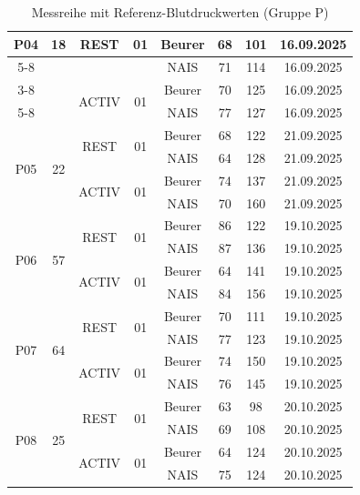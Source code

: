 \documentclass[a4paper, 11pt]{scrartcl}
\begin{document}
\begin{table}[H]
{\begin{tabular}{|c|c|c|c|c|c|c|c|}
\multirow{4}{*}{P04} & \multirow{4}{*}{18}
& \multirow{2}{*}{REST} 
& \multirow{2}{*}{01} & Beurer & 68 & 101 & 16.09.2025 \\ \cline{5-8}
& & & & NAIS & 71 & 114 & 16.09.2025 \\ \cline{3-8}
& & \multirow{2}{*}{ACTIV} 
& \multirow{2}{*}{01} & Beurer & 70 & 125 & 16.09.2025 \\ \cline{5-8}
& & & & NAIS & 77 & 127 & 16.09.2025 \\ \hline

\multirow{4}{*}{P05} & \multirow{4}{*}{22}
& \multirow{2}{*}{REST} 
& \multirow{2}{*}{01} & Beurer & 68 & 122 & 21.09.2025 \\ \cline{5-8}
& & & & NAIS & 64 & 128 & 21.09.2025 \\ \cline{3-8}
& & \multirow{2}{*}{ACTIV} 
& \multirow{2}{*}{01} & Beurer & 74 & 137 & 21.09.2025 \\ \cline{5-8}
& & & & NAIS & 70 & 160 & 21.09.2025 \\ \hline

\multirow{4}{*}{P06} & \multirow{4}{*}{57}
& \multirow{2}{*}{REST} 
& \multirow{2}{*}{01} & Beurer & 86 & 122 & 19.10.2025 \\ \cline{5-8}
& & & & NAIS & 87 & 136 & 19.10.2025 \\ \cline{3-8}
& & \multirow{2}{*}{ACTIV} 
& \multirow{2}{*}{01} & Beurer & 64 & 141 & 19.10.2025 \\ \cline{5-8}
& & & & NAIS & 84 & 156 & 19.10.2025 \\ \hline

\multirow{4}{*}{P07} & \multirow{4}{*}{64}
& \multirow{2}{*}{REST} 
& \multirow{2}{*}{01} & Beurer & 70 & 111 & 19.10.2025 \\ \cline{5-8}
& & & & NAIS & 77 & 123 & 19.10.2025 \\ \cline{3-8}
& & \multirow{2}{*}{ACTIV} 
& \multirow{2}{*}{01} & Beurer & 74 & 150 & 19.10.2025 \\ \cline{5-8}
& & & & NAIS & 76 & 145 & 19.10.2025 \\ \hline

\multirow{4}{*}{P08} & \multirow{4}{*}{25}
& \multirow{2}{*}{REST} 
& \multirow{2}{*}{01} & Beurer & 63 & 98 & 20.10.2025 \\ \cline{5-8}
& & & & NAIS & 69 & 108 & 20.10.2025 \\ \cline{3-8}
& & \multirow{2}{*}{ACTIV} 
& \multirow{2}{*}{01} & Beurer & 64 & 124 & 20.10.2025 \\ \cline{5-8}
& & & & NAIS & 75 & 124 & 20.10.2025 \\ \hline

\end{tabular}
}
\caption{Messreihe mit Referenz-Blutdruckwerten (Gruppe P)}
\label{tab:Messreihe_P}
\end{table}
\end{document}
